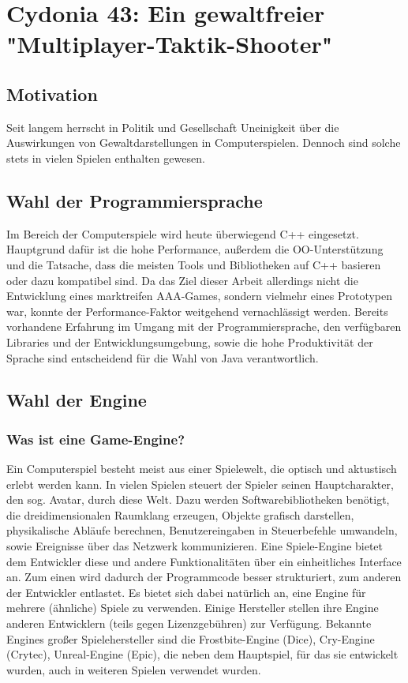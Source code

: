 \documentclass{article}
\begin{document}
\section{Cydonia 43: Ein gewaltfreier "Multiplayer-Taktik-Shooter"}

\subsection{Motivation}

Seit langem herrscht in Politik und Gesellschaft Uneinigkeit über die Auswirkungen von Gewaltdarstellungen in
Computerspielen. Dennoch sind solche stets in vielen Spielen enthalten gewesen.

\subsection{Wahl der Programmiersprache}

Im Bereich der Computerspiele wird heute überwiegend C++ eingesetzt. Hauptgrund dafür ist die hohe Performance, außerdem
die OO-Unterstützung und die Tatsache, dass die meisten Tools und Bibliotheken auf C++ basieren oder dazu kompatibel
sind. Da das Ziel dieser Arbeit allerdings nicht die Entwicklung eines marktreifen AAA-Games, sondern vielmehr eines
Prototypen war, konnte der Performance-Faktor weitgehend vernachlässigt werden. Bereits vorhandene Erfahrung im Umgang
mit der Programmiersprache, den verfügbaren Libraries und der Entwicklungsumgebung, sowie die hohe Produktivität der
Sprache sind entscheidend für die Wahl von Java verantwortlich.

\subsection{Wahl der Engine}

\subsubsection{Was ist eine Game-Engine?}

Ein Computerspiel besteht meist aus einer Spielewelt, die optisch und aktustisch erlebt werden kann. In vielen Spielen
steuert der Spieler seinen Hauptcharakter, den sog. Avatar, durch diese Welt. Dazu werden Softwarebibliotheken benötigt,
die dreidimensionalen Raumklang erzeugen, Objekte grafisch darstellen, physikalische Abläufe berechnen, Benutzereingaben
in Steuerbefehle umwandeln, sowie Ereignisse über das Netzwerk kommunizieren. Eine Spiele-Engine bietet dem
Entwickler diese und andere Funktionalitäten über ein einheitliches Interface an. Zum einen wird dadurch der
Programmcode besser strukturiert, zum anderen der Entwickler entlastet.
Es bietet sich dabei natürlich an, eine Engine für mehrere (ähnliche) Spiele zu verwenden. Einige Hersteller stellen
ihre Engine anderen Entwicklern (teils gegen Lizenzgebühren) zur Verfügung. Bekannte Engines großer Spielehersteller
sind die Frostbite-Engine (Dice), Cry-Engine (Crytec), Unreal-Engine (Epic), die neben dem Hauptspiel, für das sie
entwickelt wurden, auch in weiteren Spielen verwendet wurden.
\end{document}
